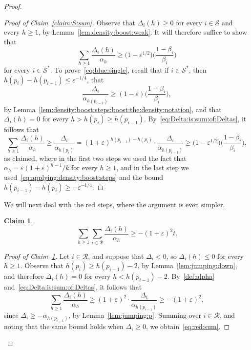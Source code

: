 \documentclass[12pt,reqno]{amsart}
\newtheorem{claim}[theorem]{Claim}
\theoremstyle{definition}
\theoremstyle{remark}
\newenvironment{clmproof}[1]{\begin{proof}[Proof of Claim~\ref{#1}]\let\qednow\qedsymbol\renewcommand{\qedsymbol}{}}{\; \qednow \end{proof}}
\def\cS{\mathcal{S}}
\newcommand\eps{\varepsilon}
\renewcommand{\le}{\leqslant}
\renewcommand{\ge}{\geqslant}
\def\eps{\varepsilon}
\def\cR{\mathcal{R}}
\begin{document}
\begin{proof}
\begin{clmproof}{claim:S:sum}
Observe that $\Delta_i(h) \ge 0$ for every $i \in \cS$ and every $h \ge 1$, by Lemma~\ref{lem:density:boost:weak}. It will therefore suffice to show that %
\begin{equation}\label{eq:blue:single} 
\sum_{h \ge 1} \frac{\Delta_i(h)}{\alpha_h} \ge \big( 1 - \eps^{1/2} \big) \bigg( \frac{1-\beta_i}{\beta_i} \bigg)
\end{equation} 
for every $i \in \cS^*$. To prove~\eqref{eq:blue:single}, recall that if $i \in \cS^*$, then $h(p_i) - h(p_{i-1}) \le \eps^{-1/4}$, that
\begin{equation}\label{eq:applying:density:boost:steps} 
\frac{\Delta_i}{\alpha_{h(p_{i-1})}} \ge (1 - \eps) \bigg( \frac{1-\beta_i}{\beta_i} \bigg), %
\end{equation} 
by Lemma~\ref{lem:density:boost:steps:boost:the:density:notation}, %
and that $\Delta_i(h) = 0$ for every $h > h(p_i) \ge h(p_{i-1})$. By~\eqref{eq:Delta:is:sum:of:Deltas}, it follows that
$$\sum_{h \ge 1} \frac{\Delta_i(h)}{\alpha_h} \ge \frac{\Delta_i}{\alpha_{h(p_i)}} = (1+\eps)^{h(p_{i-1}) - h(p_i)} \cdot \frac{\Delta_i}{\alpha_{h(p_{i-1})}} \ge \big( 1 - \eps^{1/2} \big) \bigg( \frac{1-\beta_i}{\beta_i} \bigg),$$
as claimed, where in the first two steps we used the fact that $\alpha_h = \eps (1+\eps)^{h-1} / k$ for every $h \ge 1$, and in the last step we used~\eqref{eq:applying:density:boost:steps} and the bound $h(p_{i-1}) - h(p_i) \ge - \eps^{-1/4}$.   
\end{clmproof}

We will next deal with the red steps, where the argument is even simpler. 

\begin{claim}\label{claim:red:sum}
\begin{equation}\label{eq:red:sum} 
\sum_{h \ge 1} \sum_{i \in \cR} \frac{\Delta_i(h)}{\alpha_h} \ge - (1 +\eps)^2 t.
\end{equation}
\end{claim}

\begin{clmproof}{claim:red:sum}
Let $i \in \cR$, and suppose that $\Delta_i < 0$, so $\Delta_i(h) \le 0$ for every $h \ge 1$. Observe that $h(p_i) \ge h(p_{i-1}) - 2$, by Lemma~\ref{lem:jumping:down}, and therefore $\Delta_i(h) = 0$ for every $h < h(p_{i-1}) - 2$. By~\eqref{def:alpha} and~\eqref{eq:Delta:is:sum:of:Deltas}, it follows that
$$\sum_{h \ge 1} \frac{\Delta_i(h)}{\alpha_h} \ge (1+\eps)^2 \cdot \frac{\Delta_i}{\alpha_{h(p_{i-1})}} \ge -(1+\eps)^2,$$
since $\Delta_i \ge - \alpha_{h(p_{i-1})}$, by Lemma~\ref{lem:jumping:p}. %
Summing over $i \in \cR$, and noting that the same bound holds when $\Delta_i \ge 0$, we obtain~\eqref{eq:red:sum}. 
\end{clmproof}


\end{proof}
\end{document}
